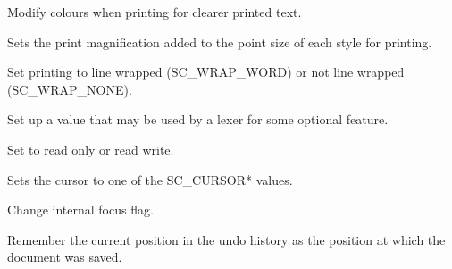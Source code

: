 \label{wxstyledtextctrlsetprintcolourmode}


Modify colours when printing for clearer printed text.


\label{wxstyledtextctrlsetprintmagnification}


Sets the print magnification added to the point size of each style for printing.


\label{wxstyledtextctrlsetprintwrapmode}


Set printing to line wrapped (SC\_WRAP\_WORD) or not line wrapped (SC\_WRAP\_NONE).


\label{wxstyledtextctrlsetproperty}


Set up a value that may be used by a lexer for some optional feature.


\label{wxstyledtextctrlsetreadonly}


Set to read only or read write.


\label{wxstyledtextctrlsetstccursor}


Sets the cursor to one of the SC\_CURSOR* values.


\label{wxstyledtextctrlsetstcfocus}


Change internal focus flag.


\label{wxstyledtextctrlsetsavepoint}


Remember the current position in the undo history as the position
at which the document was saved.


